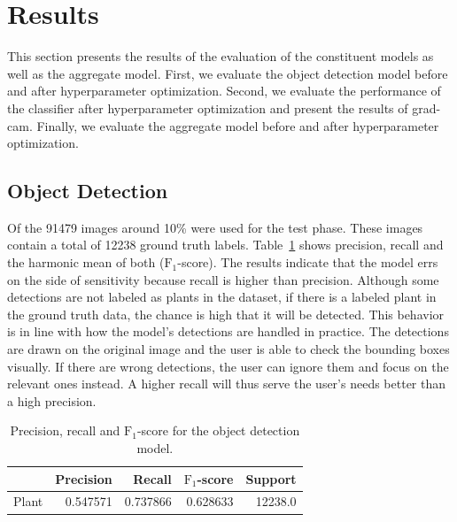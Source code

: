 \documentclass[final]{vutinfth} %
\begin{document}
\section{Results}
\label{sec:results}

This section presents the results of the evaluation of the constituent
models as well as the aggregate model. First, we evaluate the object
detection model before and after hyperparameter optimization. Second,
we evaluate the performance of the classifier after hyperparameter
optimization and present the results of \gls{grad-cam}. Finally, we
evaluate the aggregate model before and after hyperparameter
optimization.

\subsection{Object Detection}
\label{ssec:yolo-eval}

Of the \num{91479} images around 10\% were used for the test
phase. These images contain a total of \num{12238} ground truth
labels. Table~\ref{tab:yolo-metrics} shows precision, recall and the
harmonic mean of both ($\mathrm{F}_1$-score). The results indicate
that the model errs on the side of sensitivity because recall is
higher than precision. Although some detections are not labeled as
plants in the dataset, if there is a labeled plant in the ground truth
data, the chance is high that it will be detected. This behavior is in
line with how the model's detections are handled in practice. The
detections are drawn on the original image and the user is able to
check the bounding boxes visually. If there are wrong detections, the
user can ignore them and focus on the relevant ones instead. A higher
recall will thus serve the user's needs better than a high precision.

\begin{table}[h]
  \centering
  \begin{tabular}{lrrrr}
    \toprule
    {} &  Precision &    Recall &  $\mathrm{F}_1$-score &  Support \\
    \midrule
    Plant        &   \num{0.547571} &  \num{0.737866} &  \num{0.628633} &  \num{12238.0} \\
    \bottomrule
  \end{tabular}
  \caption{Precision, recall and $\mathrm{F}_1$-score for the object
    detection model.}
  \label{tab:yolo-metrics}
\end{table}
\end{document}
